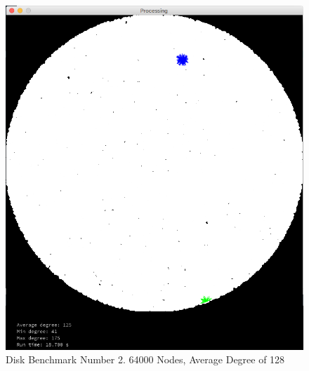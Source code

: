 \documentclass{article}
\begin{document}
\begin{center}
    \begin{figure}
        \includegraphics[scale=0.45]{./images/disk_2.png}
        \caption{Disk Benchmark Number 2. 64000 Nodes, Average Degree of 128}
        \label{disk2}
    \end{figure}
\end{center}
\end{document}
